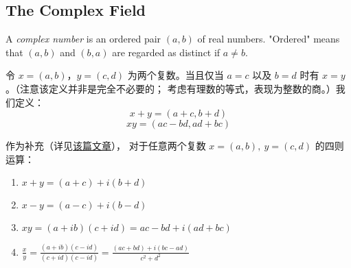 \documentclass[../poma-notes.tex]{subfiles}
\begin{document}
\subsection*{The Complex Field}

\begin{definition}
	A \textit{complex number} is an ordered pair $(a, b)$ of real numbers. "Ordered" means that $(a, b)$ and $(b, a)$
	are regarded as distinct if $a \neq b$.
\end{definition}

令 $x=(a,b)$，$y=(c,d)$ 为两个复数。当且仅当 $a=c$ 以及 $b=d$ 时有 $x=y$。（注意该定义并非是完全不必要的；
考虑有理数的等式，表现为整数的商。）我们定义：
\[x+y=(a+c,b+d)\]
\[xy=(ac-bd,ad+bc)\]

\begin{anote}
	作为补充（详见\href{https://zhuanlan.zhihu.com/p/68763358}{该篇文章}），
	对于任意两个复数 $x=(a,b),\ y=(c,d)$ 的四则运算：
	\begin{enumerate}[label=(\arabic*)]
		\item $x+y=(a+c)+i(b+d)$
		\item $x-y=(a-c)+i(b-d)$
		\item $xy=(a+ib)(c+id)=ac-bd+i(ad+bc)$
		\item $\frac{x}{y} = \frac{(a+ib)(c-id)}{(c+id)(c-id)} = \frac{(ac+bd)+i(bc-ad)}{c^2+d^2}$
	\end{enumerate}


\end{anote}
\end{document}
